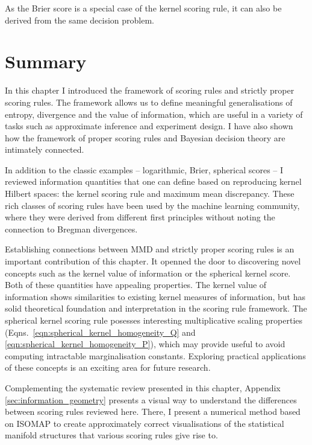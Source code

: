 As the Brier score is a special case of the kernel scoring rule, it can also be derived from the same decision problem.

\section{Summary}

In this chapter I introduced the framework of scoring rules and strictly proper scoring rules. The framework allows us to define meaningful generalisations of entropy, divergence and the value of information, which are useful in a variety of tasks such as approximate inference and experiment design. I have also shown how the framework of proper scoring rules and Bayesian decision theory are intimately connected.

In addition to the classic examples -- logarithmic, Brier, spherical scores -- I reviewed information quantities that one can define based on reproducing kernel Hilbert spaces: the kernel scoring rule and maximum mean discrepancy. These rich classes of scoring rules have been used by the machine learning community, where they were derived from different first principles without noting the connection to Bregman divergences.

\cbstart
Establishing connections between MMD and strictly proper scoring rules is an important contribution of this chapter. It openned the door to discovering novel concepts such as the kernel value of information or the spherical kernel score. Both of these quantities have appealing properties. The kernel value of information shows similarities to existing kernel measures of information, but has solid theoretical foundation and interpretation in the scoring rule framework. The spherical kernel scoring rule posesses interesting multiplicative scaling properties (Eqns.\ \eqref{eqn:spherical_kernel_homogeneity_Q} and \eqref{eqn:spherical_kernel_homogeneity_P}), which may provide useful to avoid computing intractable marginalisation constants. Exploring practical applications of these concepts is an exciting area for future research.

Complementing the systematic review presented in this chapter, Appendix \ref{sec:information_geometry} presents a visual way to understand the differences between scoring rules reviewed here. There, I present a numerical method based on ISOMAP \citep{Tenenbaum2000} to create approximately correct visualisations of the statistical manifold structures that various scoring rules give rise to.

